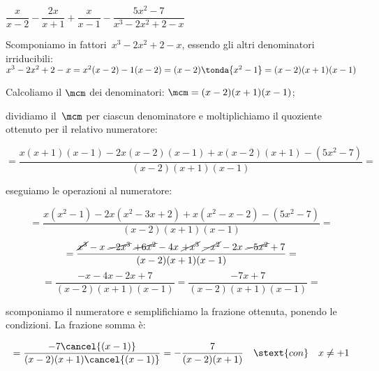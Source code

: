 
\begin{esempio}{}{}
\(\dfrac{x}{x-2}-\dfrac{2x}{x+1}+
\dfrac{x}{x-1}-\dfrac{5x^{2}-7}{x^{3}-2x^{2}+2-x}\)\\

\begin{enumeratea}
\item Scomponiamo in fattori~\(x^{3}-2x^{2}+2-x\), 
essendo gli altri denominatori irriducibili: 
\(x^{3}-2x^{2}+2-x=x^2(x-2)-1(x-2)=(x-2) \tonda{x^2-1} =
  (x-2)(x+1)(x-1)\)%

\item Calcoliamo il \(\mcm\) dei denominatori: 
\(\mcm=(x-2)(x+1)(x-1)\);

\item dividiamo il~\(\mcm\) per ciascun denominatore e moltiplichiamo il 
quoziente ottenuto per il relativo numeratore:

\vspace{-2em}
\[=\dfrac{x(x+1)(x-1)-2x(x-2)(x-1)+x(x-2)(x+1)-(5x^{2}-7)}
        {(x-2)(x+1)(x-1)}=\]
\item eseguiamo le operazioni al numeratore:

\vspace{-2em}
\[=\dfrac{x(x^2-1)-2x(x^2-3x+2)+x(x^2-x-2)-(5x^{2}-7)}{(x-2)(x+1)(x-1)} = \]
\[=\dfrac{\cancel{x^3}-x~\cancel{-2x^3}~\cancel{+6x^2}-4x~\cancel{+x^3}
        ~\cancel{-x^2}-2x~\cancel{-5x^2}+7}
        {(x-2)(x+1)(x-1)}=\]
\[=\dfrac{-x-4x-2x+7}{(x-2)(x+1)(x-1)}=\dfrac{-7x+7}{(x-2)(x+1)(x-1)}=\]
\item scomponiamo il numeratore e semplifichiamo la frazione ottenuta, 
ponendo le condizioni. La frazione somma è:

\vspace{-2em}
\[=\dfrac{-7\cancel{(x-1)}}{(x-2)(x+1)\cancel{(x-1)}}=
  -{\dfrac{7}{(x-2)(x+1)}} \quad  \stext{con} \quad x \neq +1\]
\end{enumeratea}
\end{esempio}

